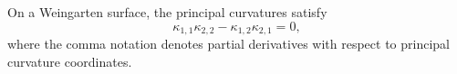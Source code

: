 On a Weingarten surface, the principal curvatures satisfy
$$\kappa_{1,1}\kappa_{2,2} - \kappa_{1,2}\kappa_{2,1} = 0,$$
where the comma notation denotes partial derivatives with respect to principal curvature coordinates.
